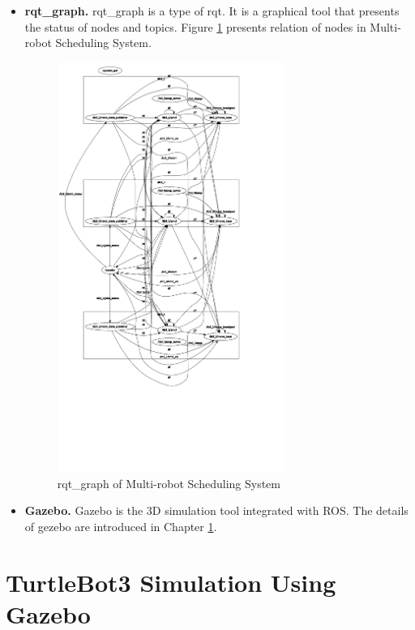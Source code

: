 \begin{itemize}
    \item \textbf{rqt\_graph.} rqt\_graph is a type of rqt. It is a graphical tool that presents the status of nodes and topics. Figure \ref{fig:rqt_graph} presents relation of nodes in Multi-robot Scheduling System.
    \begin{figure}[htbp]
        \centering
        \includegraphics[width = 0.7\textwidth]{content/images/ch2/rosgraph.png}
        \caption{rqt\_graph of Multi-robot Scheduling System}
        \label{fig:rqt_graph}
    \end{figure}

    \item \textbf{Gazebo.} Gazebo \cite{GZ} is the 3D simulation tool integrated with ROS. The details of gezebo are introduced in Chapter \ref{sec:modeling_gazebo}.
\end{itemize}

\section{TurtleBot3 Simulation Using Gazebo}
\label{sec:modeling_gazebo}

